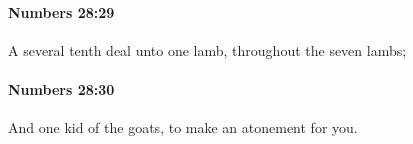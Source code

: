 		\paragraph{Numbers 28:29} %
			\label{NUMBERS-28-29}

			A several tenth deal unto one lamb, throughout the seven lambs;


		\paragraph{Numbers 28:30} %
			\label{NUMBERS-28-30}

			And one kid of the goats, to make an atonement for you.


